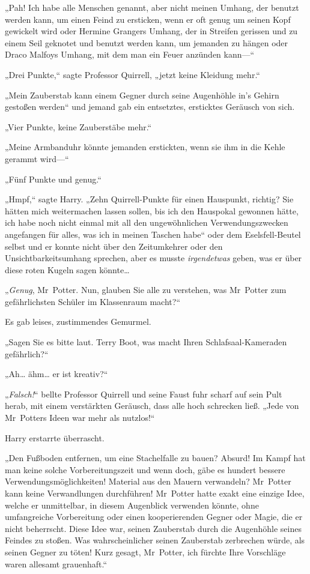 {„Pah! Ich habe alle Menschen genannt, aber nicht meinen Umhang, der benutzt werden kann, um einen Feind zu ersticken, wenn er oft genug um seinen Kopf gewickelt wird oder Hermine Grangers Umhang, der in Streifen gerissen und zu einem Seil geknotet und benutzt werden kann, um jemanden zu hängen oder Draco Malfoys Umhang, mit dem man ein Feuer anzünden kann—“

„Drei Punkte,“ sagte Professor Quirrell, „jetzt keine Kleidung mehr.“

„Mein Zauberstab kann einem Gegner durch seine Augenhöhle in's Gehirn gestoßen werden“ und jemand gab ein entsetztes, ersticktes Geräusch von sich.

„Vier Punkte, keine Zauberstäbe mehr.“

„Meine Armbanduhr könnte jemanden erstickten, wenn sie ihm in die Kehle gerammt wird—“

„Fünf Punkte und genug.“

„Hmpf,“ sagte Harry. „Zehn Quirrell-Punkte für einen Hauspunkt, richtig? Sie hätten mich weitermachen lassen sollen, bis ich den Hauspokal gewonnen hätte, ich habe noch nicht einmal mit all den ungewöhnlichen Verwendungszwecken angefangen für alles, was ich in meinen Taschen habe“ oder dem Eselsfell-Beutel selbst und er konnte nicht über den Zeitumkehrer oder den Unsichtbarkeitsumhang sprechen, aber es musste \emph{irgendetwas} geben, was er über diese roten Kugeln sagen könnte…

„\emph{Genug}, Mr~Potter. Nun, glauben Sie alle zu verstehen, was Mr~Potter zum gefährlichsten Schüler im Klassenraum macht?“

Es gab leises, zustimmendes Gemurmel.

„Sagen Sie es bitte laut. Terry Boot, was macht Ihren Schlafsaal-Kameraden gefährlich?“

„Ah… ähm… er ist kreativ?“

„\emph{Falsch!}“ bellte Professor Quirrell und seine Faust fuhr scharf auf sein Pult herab, mit einem verstärkten Geräusch, dass alle hoch schrecken ließ. „Jede von Mr~Potters Ideen war mehr als nutzlos!“

Harry erstarrte überrascht.

„Den Fußboden entfernen, um eine Stachelfalle zu bauen? Absurd! Im Kampf hat man keine solche Vorbereitungszeit und wenn doch, gäbe es hundert bessere Verwendungsmöglichkeiten! Material aus den Mauern verwandeln? Mr~Potter kann keine Verwandlungen durchführen! Mr~Potter hatte exakt eine einzige Idee, welche er unmittelbar, in diesem Augenblick verwenden könnte, ohne umfangreiche Vorbereitung oder einen kooperierenden Gegner oder Magie, die er nicht beherrscht. Diese Idee war, seinen Zauberstab durch die Augenhöhle seines Feindes zu stoßen. Was wahrscheinlicher seinen Zauberstab zerbrechen würde, als seinen Gegner zu töten! Kurz gesagt, Mr~Potter, ich fürchte Ihre Vorschläge waren allesamt grauenhaft.“

}
